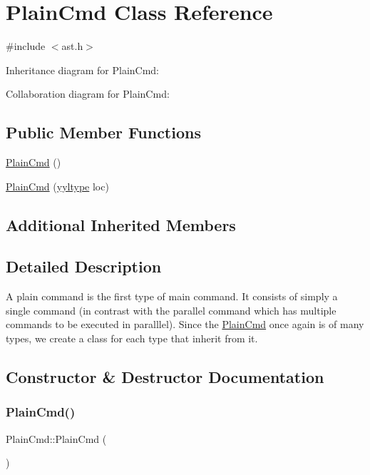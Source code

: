 \hypertarget{class_plain_cmd}{}\section{Plain\+Cmd Class Reference}
\label{class_plain_cmd}


{\ttfamily \#include $<$ast.\+h$>$}



Inheritance diagram for Plain\+Cmd\+:


Collaboration diagram for Plain\+Cmd\+:
\subsection*{Public Member Functions}
\begin{DoxyCompactItemize}
\item 
\hyperlink{class_plain_cmd_a2ac79af6c1d68b6e0d0f0a160ad7b6ff}{Plain\+Cmd} ()
\item 
\hyperlink{class_plain_cmd_ad20a90f03ef6a1b71193df4d6ffef08d}{Plain\+Cmd} (\hyperlink{structyyltype}{yyltype} loc)
\end{DoxyCompactItemize}
\subsection*{Additional Inherited Members}


\subsection{Detailed Description}
A plain command is the first type of main command. It consists of simply a single command (in contrast with the parallel command which has multiple commands to be executed in paralllel). Since the \hyperlink{class_plain_cmd}{Plain\+Cmd} once again is of many types, we create a class for each type that inherit from it. 

\subsection{Constructor \& Destructor Documentation}
\mbox{\label{class_plain_cmd_a2ac79af6c1d68b6e0d0f0a160ad7b6ff}} 
\subsubsection{\texorpdfstring{Plain\+Cmd()}{PlainCmd()}\hspace{0.1cm}{\footnotesize\ttfamily [1/2]}}
{\footnotesize\ttfamily Plain\+Cmd\+::\+Plain\+Cmd (\begin{DoxyParamCaption}{ }\end{DoxyParamCaption})\hspace{0.3cm}{\ttfamily [inline]}}

